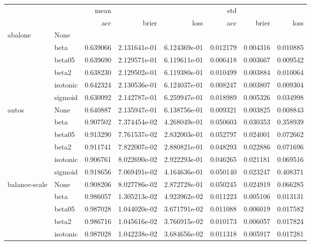 \begin{tabular}{llrrrrrr}
\toprule
        &      &      mean &               &               &       std &           &           \\
        &      &       acc &         brier &          loss &       acc &     brier &      loss \\
\midrule
abalone & None &           &               &               &           &           &           \\
        & beta &  0.639066 &  2.131641e-01 &  6.124369e-01 &  0.012179 &  0.004316 &  0.010885 \\
        & beta05 &  0.639690 &  2.129571e-01 &  6.119611e-01 &  0.006418 &  0.003667 &  0.009542 \\
        & beta2 &  0.638230 &  2.129502e-01 &  6.119380e-01 &  0.010499 &  0.003884 &  0.010064 \\
        & isotonic &  0.642324 &  2.130536e-01 &  6.124037e-01 &  0.008247 &  0.003807 &  0.009304 \\
        & sigmoid &  0.630092 &  2.142787e-01 &  6.259947e-01 &  0.018989 &  0.005326 &  0.034998 \\
autos & None &  0.640887 &  2.135947e-01 &  6.138756e-01 &  0.009321 &  0.003825 &  0.008843 \\
        & beta &  0.907502 &  7.374454e-02 &  4.268049e-01 &  0.050603 &  0.030353 &  0.358939 \\
        & beta05 &  0.913290 &  7.761537e-02 &  2.832003e-01 &  0.052797 &  0.024001 &  0.072662 \\
        & beta2 &  0.911741 &  7.822007e-02 &  2.880821e-01 &  0.048293 &  0.022886 &  0.071696 \\
        & isotonic &  0.906761 &  8.022690e-02 &  2.922293e-01 &  0.046265 &  0.021181 &  0.069516 \\
        & sigmoid &  0.918656 &  7.069491e-02 &  4.164636e-01 &  0.050140 &  0.023247 &  0.408371 \\
balance-scale & None &  0.908206 &  8.027786e-02 &  2.872728e-01 &  0.050245 &  0.024919 &  0.066285 \\
        & beta &  0.986057 &  1.305213e-02 &  4.923962e-02 &  0.011223 &  0.005106 &  0.013131 \\
        & beta05 &  0.987028 &  1.044020e-02 &  3.671791e-02 &  0.011088 &  0.006019 &  0.017582 \\
        & beta2 &  0.986716 &  1.045616e-02 &  3.766915e-02 &  0.010173 &  0.006057 &  0.017824 \\
        & isotonic &  0.987028 &  1.042238e-02 &  3.684656e-02 &  0.011318 &  0.005917 &  0.017281 \\

\end{tabular}

